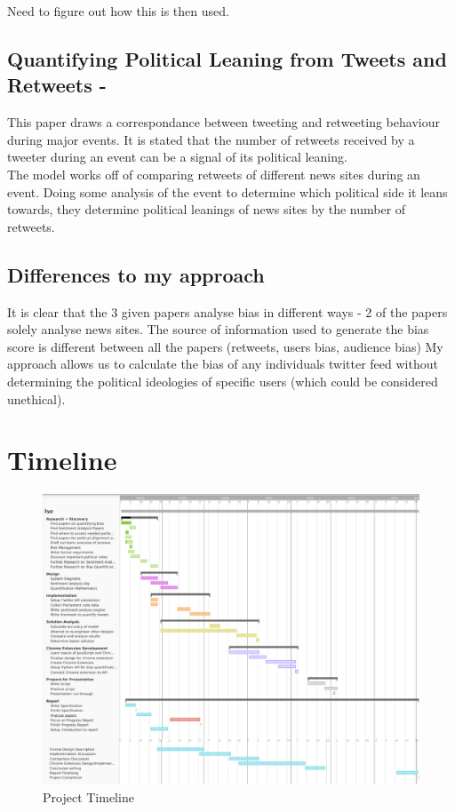 \documentclass[a4paper,fleqn,10pt]{article}
\begin{document}
Need to figure out how this is then used.
\subsection{Quantifying Political Leaning from Tweets and Retweets - \cite{retweetspoliticallean}}
This paper draws a correspondance between tweeting and retweeting behaviour during major events.
It is stated that the number of retweets received by a tweeter during an event can be a signal of its political leaning.\\
The model works off of comparing retweets of different news sites during an event. Doing some analysis of the event
to determine which political side it leans towards, they determine political leanings of news sites by the number of retweets.

\subsection{Differences to my approach}
It is clear that the 3 given papers analyse bias in different ways - 2 of the papers solely analyse news sites.
The source of information used to generate the bias score is different between all the papers (retweets, users bias, audience bias)
My approach allows us to calculate the bias of any individuals twitter feed without determining the political ideologies of specific
users (which could be considered unethical).
\section{Timeline}
\label{sec:timeline}
\begin{figure}[htbp]
    \includegraphics[width=150mm]{../images/3yp timeline.png}
    \caption{Project Timeline}
    \label{fig:timeline}
\end{figure}
\end{document}
